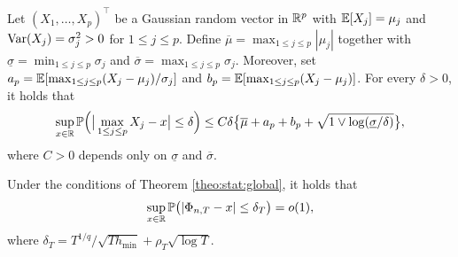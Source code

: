 \documentclass[a4paper,12pt]{article}
\begin{document}
\begin{propA}{\cite{KhismatullinaVogt2020}}\label{theoA:anticon}
Let $(X_1,\ldots,X_p)^\top$ be a Gaussian random vector in $\mathbb{R}^p$ with $\mathbb{E}[X_j] = \mu_j$ and $\textnormal{Var}(X_j) = \sigma_j^2 > 0$ for $1 \le j \le p$. Define $\overline{\mu} = \max_{1 \le j \le p} |\mu_j|$ together with $\underline{\sigma} = \min_{1 \le j \le p} \sigma_j$ and $\overline{\sigma} = \max_{1 \le j \le p} \sigma_j$. Moreover, set $a_p = \mathbb{E}[ \max_{1 \le j \le p} (X_j-\mu_j)/\sigma_j ]$ and $b_p = \mathbb{E}[ \max_{1 \le j \le p} (X_j-\mu_j) ]$. For every $\delta > 0$, it holds that
\[ \sup_{x \in \mathbb{R}} \mathbb{P} \Big( \big| \max_{1 \le j \le p} X_j - x \big| \le \delta \Big) \le C \delta \big\{ \overline{\mu} + a_p + b_p + \sqrt{1 \vee \log(\underline{\sigma}/\delta)} \big\}, \]
where $C > 0$ depends only on $\underline{\sigma}$ and $\overline{\sigma}$. 
\end{propA} 
\begin{propA}\label{propA:anticon}
Under the conditions of Theorem \ref{theo:stat:global}, it holds that 
\begin{align}\label{eqA:anticon} \sup_{x \in \mathbb{R}} \mathbb{P} \big( | \Phi_{n,T} - x | \le \delta_T \big) = o(1),
\end{align}
where $\delta_T = T^{1/q} / \sqrt{T h_{\min}} + \rho_T \sqrt{\log T}$.
\end{propA}
\end{document}
